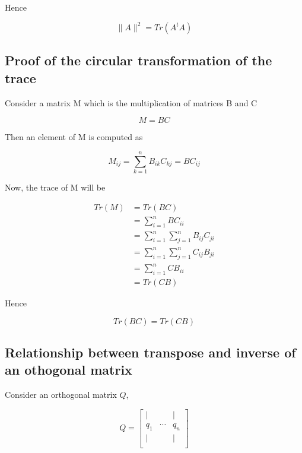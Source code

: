 \documentclass[12pt,journal]{IEEEtran}
\begin{document}
    Hence

    \begin{equation*}
        \lVert A \rVert^2 = Tr(A^tA)
    \end{equation*}

    \subsection{Proof of the circular transformation of the trace} \label{circular_trace}

    Consider a matrix M which is the multiplication of matrices B and C

    \begin{equation*}
        M = BC
    \end{equation*}

    Then an element of M is computed as

    \begin{equation*}
        M_{ij} = \sum_{k=1}^n B_{ik} C_{kj} = BC_{ij}
    \end{equation*}

    Now, the trace of M will be

    \begin{equation*}
        \begin{aligned}
            Tr(M) &= Tr(BC)\\
                  &= \sum_{i=1}^n BC_{ii}\\
                  &= \sum_{i=1}^n \sum_{j=1}^n B_{ij} C_{ji}\\
                  &= \sum_{i=1}^n \sum_{j=1}^n C_{ij} B_{ji}\\
                  &= \sum_{i=1}^n CB_{ii}\\
                  &= Tr(CB)
        \end{aligned}
    \end{equation*}

    Hence

    \begin{equation*}
        Tr(BC) = Tr(CB)
    \end{equation*}

    \subsection{Relationship between transpose and inverse of an othogonal matrix}
    \label{orthogonal}

    Consider an orthogonal matrix $Q$,

    \[
        Q =
        \begin{bmatrix}
             |  &        &  | \\
            q_1 & \cdots & q_n\\
             |  &        &  | \\
        \end{bmatrix}
    \]
\end{document}
